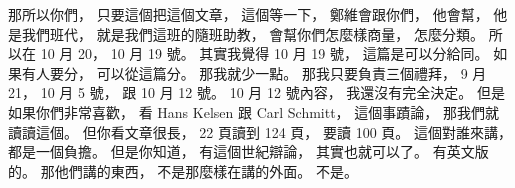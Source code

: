 \hypertarget{w01:cue:680}{}那所以你們，
\hypertarget{w01:cue:681}{}只要這個把這個文章，
\hypertarget{w01:cue:682}{}這個等一下，
\hypertarget{w01:cue:683}{}鄭維會跟你們，
\hypertarget{w01:cue:684}{}他會幫，
\hypertarget{w01:cue:685}{}他是我們班代，
\hypertarget{w01:cue:686}{}就是我們這班的隨班助教，
\hypertarget{w01:cue:687}{}會幫你們怎麼樣商量，
\hypertarget{w01:cue:688}{}怎麼分類。
\hypertarget{w01:cue:689}{}所以在 10 月 20，
\hypertarget{w01:cue:690}{}10 月 19 號。
\hypertarget{w01:cue:691}{}其實我覺得 10 月 19 號，
\hypertarget{w01:cue:692}{}這篇是可以分給同。
\hypertarget{w01:cue:693}{}如果有人要分，
\hypertarget{w01:cue:694}{}可以從這篇分。
\hypertarget{w01:cue:695}{}那我就少一點。
\hypertarget{w01:cue:696}{}那我只要負責三個禮拜，
\hypertarget{w01:cue:697}{}9 月 21，
\hypertarget{w01:cue:698}{}10 月 5 號，
\hypertarget{w01:cue:699}{}跟 10 月 12 號。
\hypertarget{w01:cue:700}{}10 月 12 號內容，
\hypertarget{w01:cue:701}{}我還沒有完全決定。
\hypertarget{w01:cue:702}{}但是如果你們非常喜歡，
\hypertarget{w01:cue:703}{}看 Hans Kelsen 跟 Carl Schmitt，
\hypertarget{w01:cue:704}{}這個事蹟論，
\hypertarget{w01:cue:705}{}那我們就讀讀這個。
\hypertarget{w01:cue:706}{}但你看文章很長，
\hypertarget{w01:cue:707}{}22 頁讀到 124 頁，
\hypertarget{w01:cue:708}{}要讀 100 頁。
\hypertarget{w01:cue:709}{}這個對誰來講，
\hypertarget{w01:cue:710}{}都是一個負擔。
\hypertarget{w01:cue:711}{}但是你知道，
\hypertarget{w01:cue:712}{}有這個世紀辯論，
\hypertarget{w01:cue:713}{}其實也就可以了。
\hypertarget{w01:cue:714}{}有英文版的。
\hypertarget{w01:cue:715}{}那他們講的東西，
\hypertarget{w01:cue:716}{}不是那麼樣在講的外面。
\hypertarget{w01:cue:717}{}不是。

